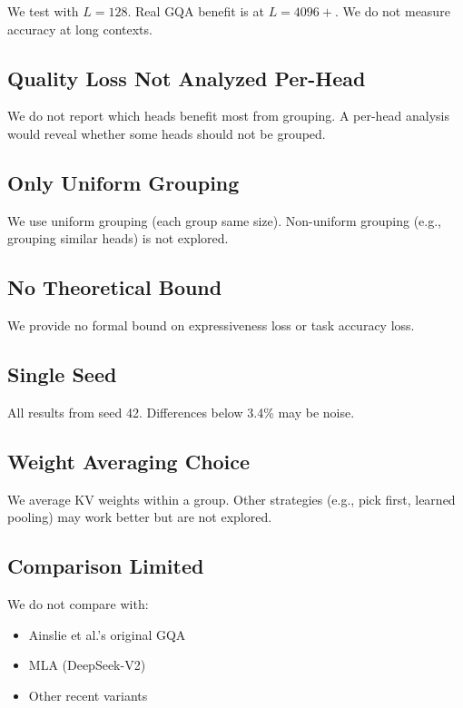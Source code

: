 We test with $L = 128$. Real GQA benefit is at $L = 4096+$. We do not 
measure accuracy at long contexts.

\subsection{Quality Loss Not Analyzed Per-Head}

We do not report which heads benefit most from grouping. A per-head analysis 
would reveal whether some heads should not be grouped.

\subsection{Only Uniform Grouping}

We use uniform grouping (each group same size). Non-uniform grouping 
(e.g., grouping similar heads) is not explored.

\subsection{No Theoretical Bound}

We provide no formal bound on expressiveness loss or task accuracy loss.

\subsection{Single Seed}

All results from seed 42. Differences below 3.4\% may be noise.

\subsection{Weight Averaging Choice}

We average KV weights within a group. Other strategies (e.g., pick first, 
learned pooling) may work better but are not explored.

\subsection{Comparison Limited}

We do not compare with:
\begin{itemize}
\item Ainslie et al.'s original GQA
\item MLA (DeepSeek-V2)
\item Other recent variants

\end{itemize}
